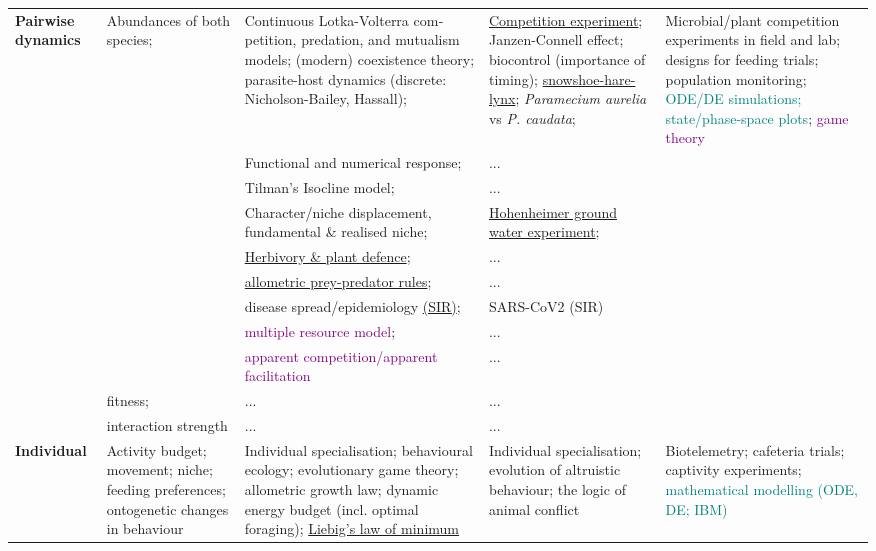 \documentclass[english,11pt,a4paper, landscape]{article}
\begin{document}
\begin{tabularx}{\textwidth}{p{2cm}>{\raggedright\arraybackslash}X>{\raggedright\arraybackslash}X>{\raggedright\arraybackslash}X|>{\raggedright\arraybackslash}X}
\textbf{Pairwise} \newline \textbf{dynamics}  & Abundances of both species; & Continuous Lotka-Volterra com­petition, predation, and mutualism models; (modern) coexistence theory; parasite-host dynamics (discrete: Nicholson-Bailey, Hassall); & \href{https://esajournals.onlinelibrary.wiley.com/doi/10.1002/ecy.2187}{Competition experiment}; Janzen-Connell effect; biocontrol (importance of timing);
\href{https://www.science.org/doi/10.1126/science.269.5227.1112}{snowshoe-hare-lynx}; \emph{Paramecium aurelia} vs \emph{P. caudata}; & Microbial/plant competition experiments in field and lab; designs for feeding trials; population monitoring; \textcolor{teal}{ODE/DE simulations;
state/phase-space plots}; \textcolor{purple}{game theory}\\
	&& Functional and numerical response; & ... & \\
 	&&  Tilman's Isocline model; & ... & \\	
 	&&  Character/niche displacement, fundamental \& realised niche; & \href{https://journals.plos.org/plosone/article?id=10.1371/journal.pone.0043358}{Hohenheimer ground water experiment};& \\	
 	&&  \href{https://www.journals.uchicago.edu/doi/abs/10.1086/285022}{Herbivory \& plant defence}; & ... &  \\	
 	&&  \href{https://journals.aps.org/pre/abstract/10.1103/PhysRevE.99.022405}{allo­metric prey-predator rules}; & ... & \\	
 	&&  disease spread/epidemiology \href{https://shiny.aj2duncan.com/risk/disease/}{(SIR)}; & SARS-CoV2 (SIR) & \\	
 	&&  \textcolor{purple}{multiple resource model}; &... &  \\	
 	&&  \textcolor{purple}{apparent competition/apparent facilitation} & ... & \\	
 	& fitness; & ... & ... & \\
 	& interaction strength &... & ...& \\ \hline

\rowcolor{lightgray}
\textbf{Individual} & Activity budget; movement; niche; feed­ing preferences; ontogenetic changes in beha­viour  & Individual specialisa­tion; behavioural eco­logy; evolutionary game theory; allomet­ric growth law; dy­namic energy budget (incl. optimal foraging); \href{https://en.wikipedia.org/wiki/Liebig\%27s_law_of_the_minimum}{Liebig’s law of minimum} &  Individual specialisa­tion; evolution of altru­istic behaviour; the lo­gic of animal conflict & Biotelemetry; cafeteria tri­als; captivity experiments; \textcolor{teal}{mathematical modelling (ODE, DE; IBM)} \\ \hline


\end{tabularx}
\end{document}
